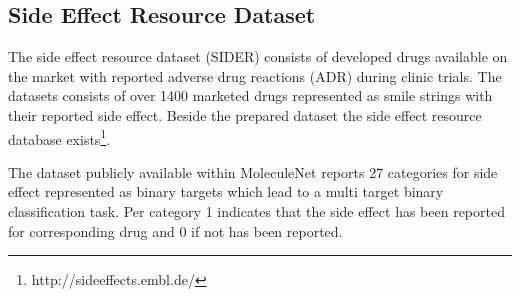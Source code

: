 \documentclass[../main.tex]{subfiles}
\begin{document}
\subsection{Side Effect Resource Dataset}

The side effect resource dataset (SIDER) consists of developed drugs available on the market with reported adverse drug reactions (ADR) during clinic trials. The datasets consists of over 1400 marketed drugs represented as smile strings with their reported side effect\cite{kuhn_sider_2016}. Beside the prepared dataset the side effect resource database exists\footnote{http://sideeffects.embl.de/}. 

The dataset publicly available within MoleculeNet \cite{wu_moleculenet_2018} reports 27 categories for side effect represented as binary targets which lead to a multi target binary classification task. Per category 1 indicates that the side effect has been reported for corresponding drug and 0 if not has been reported. 
\end{document}
